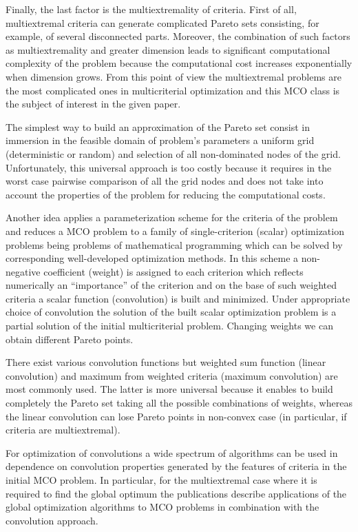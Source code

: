 \documentclass[]{interact}
\theoremstyle{plain}%
\theoremstyle{definition}
\theoremstyle{remark}
\begin{document}
Finally, the last factor is the multiextremality of criteria. First of all, multiextremal criteria can generate complicated Pareto sets consisting, for example, of several disconnected parts. Moreover, the combination of such factors as multiextremality and greater dimension leads to significant computational complexity of the problem because the computational cost increases exponentially when dimension grows. From this point of view the multiextremal problems are the most complicated ones in multicriterial optimization and this MCO class is the subject of interest in the given paper. 

The simplest way to build an approximation of the Pareto set consist in immersion in the feasible domain of problem's parameters a uniform grid (deterministic or random) and selection of all non-dominated nodes of the grid. Unfortunately, this universal approach is too costly because it requires in the worst case pairwise comparison of all the grid nodes and does not take into account the properties of the problem for reducing the computational costs.

Another idea applies a parameterization scheme for the criteria of the problem and reduces a MCO problem to a family of single-criterion (scalar) optimization problems being problems of mathematical programming which can be solved by corresponding well-developed optimization methods. In this scheme a non-negative coefficient (weight) is assigned to each criterion which reflects numerically an ``importance'' of the criterion and on the base of such weighted criteria a scalar function (convolution) is built and minimized. Under appropriate choice of convolution the solution of the built scalar optimization problem is a partial solution of the initial multicriterial problem. Changing weights we can obtain different Pareto points. 

There exist various convolution functions but weighted sum function (linear convolution) and maximum from weighted criteria (maximum convolution) are most commonly used. The latter is more universal because it enables to build completely the Pareto set taking all the possible combinations of weights, whereas the linear convolution can lose Pareto points in non-convex case (in particular, if criteria are multiextremal).

For optimization of convolutions a wide spectrum of algorithms can be used in dependence on convolution properties generated by the features of criteria in the initial MCO problem. In particular, for the multiextremal case where it is required to find the global optimum the publications \cite{Evtushenko2014,Zilinskas2015,GERGEL2017_1,Gergel2019_2,Barkalov2021} describe applications of the global optimization algorithms to MCO problems in combination with the convolution approach.
\end{document}
